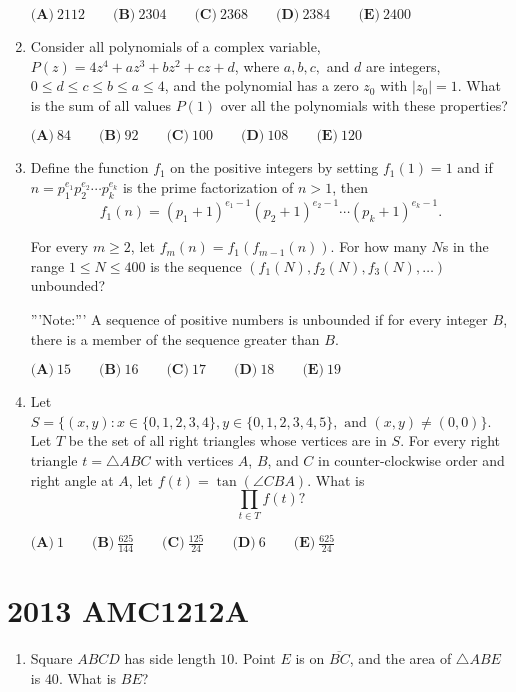\documentclass{article}
\begin{document}
\begin{enumerate}[label=\arabic*., itemsep=0.5em]
\(\textbf{(A)}\ 2112\qquad\textbf{(B)}\ 2304\qquad\textbf{(C)}\ 2368\qquad\textbf{(D)}\ 2384\qquad\textbf{(E)}\ 2400\)\par \vspace{0.5em}\item Consider all polynomials of a complex variable, \(P(z)=4z^4+az^3+bz^2+cz+d\), where \(a,b,c,\) and \(d\) are integers, \(0\le d\le c\le b\le a\le 4\), and the polynomial has a zero \(z_0\) with \(|z_0|=1.\) What is the sum of all values \(P(1)\) over all the polynomials with these properties?

\(\textbf{(A)}\ 84\qquad\textbf{(B)}\ 92\qquad\textbf{(C)}\ 100\qquad\textbf{(D)}\ 108\qquad\textbf{(E)}\ 120 \)\par \vspace{0.5em}\item Define the function \(f_1\) on the positive integers by setting \(f_1(1)=1\) and if \(n=p_1^{e_1}p_2^{e_2}\cdots p_k^{e_k}\) is the prime factorization of \(n>1\), then 
\begin{equation*}
f_1(n)=(p_1+1)^{e_1-1}(p_2+1)^{e_2-1}\cdots (p_k+1)^{e_k-1}.
\end{equation*}

For every \(m\ge 2\), let \(f_m(n)=f_1(f_{m-1}(n))\). For how many \(N\)s in the range \(1\le N\le 400\) is the sequence \((f_1(N),f_2(N),f_3(N),\dots )\) unbounded?

'''Note:''' A sequence of positive numbers is unbounded if for every integer \(B\), there is a member of the sequence greater than \(B\).

\(\textbf{(A)}\ 15\qquad\textbf{(B)}\ 16\qquad\textbf{(C)}\ 17\qquad\textbf{(D)}\ 18\qquad\textbf{(E)}\ 19 \)\par \vspace{0.5em}\item Let \(S=\{(x,y) : x\in \{0,1,2,3,4\}, y\in \{0,1,2,3,4,5\},\text{ and } (x,y)\ne (0,0)\}\). 
Let \(T\) be the set of all right triangles whose vertices are in \(S\). For every right triangle \(t=\triangle{ABC}\) with vertices \(A\), \(B\), and \(C\) in counter-clockwise order and right angle at \(A\), let \(f(t)=\tan(\angle{CBA})\). What is 
\begin{equation*}
\prod_{t\in T} f(t)?
\end{equation*}


\(\textbf{(A)}\ 1\qquad\textbf{(B)}\ \frac{625}{144}\qquad\textbf{(C)}\ \frac{125}{24}\qquad\textbf{(D)}\ 6\qquad\textbf{(E)}\ \frac{625}{24} \)\par \vspace{0.5em}\end{enumerate}\newpage\section*{2013 AMC1212A}\begin{enumerate}[label=\arabic*., itemsep=0.5em]\item Square \( ABCD \) has side length \( 10 \). Point \( E \) is on \( \overline{BC} \), and the area of \( \bigtriangleup ABE \) is \( 40 \). What is \( BE \)?


\end{enumerate}
\end{document}
